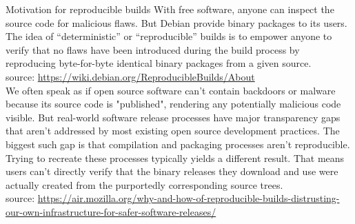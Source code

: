 \documentclass[11pt]{beamer}
\begin{document}
\begin{frame}{Motivation for reproducible builds}
With free software, anyone can inspect the source code for malicious flaws. But Debian provide binary packages to its users. The idea of “deterministic” or “reproducible” builds is to empower anyone to verify that no flaws have been introduced during the build process by reproducing byte-for-byte identical binary packages from a given source. \\
source: \href{https://wiki.debian.org/ReproducibleBuilds/About}{https://wiki.debian.org/ReproducibleBuilds/About}
\\[0.1cm]
We often speak as if open source software can't contain backdoors or malware because its source code is "published", rendering any potentially malicious code visible. But real-world software release processes have major transparency gaps that aren't addressed by most existing open source development practices. The biggest such gap is that compilation and packaging processes aren't reproducible. Trying to recreate these processes typically yields a different result. That means users can't directly verify that the binary releases they download and use were actually created from the purportedly corresponding source trees.\\
source: \href{https://air.mozilla.org/why-and-how-of-reproducible-builds-distrusting-our-own-infrastructure-for-safer-software-releases/}{https://air.mozilla.org/why-and-how-of-reproducible-builds-distrusting-our-own-infrastructure-for-safer-software-releases/}
\end{frame}
\end{document}
